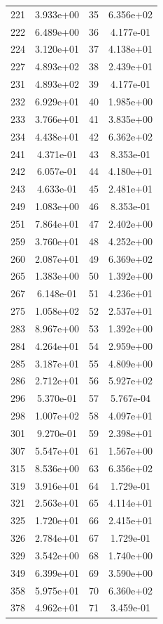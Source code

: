 \documentclass[12pt]{article}
\begin{document}
\begin{longtable}{@{}cccc@{}}
221 & 3.933e+00 & 35 & 6.356e+02 \\
222 & 6.489e+00 & 36 & 4.177e-01 \\
224 & 3.120e+01 & 37 & 4.138e+01 \\
227 & 4.893e+02 & 38 & 2.439e+01 \\
231 & 4.893e+02 & 39 & 4.177e-01 \\
232 & 6.929e+01 & 40 & 1.985e+00 \\
233 & 3.766e+01 & 41 & 3.835e+00 \\
234 & 4.438e+01 & 42 & 6.362e+02 \\
241 & 4.371e-01 & 43 & 8.353e-01 \\
242 & 6.057e-01 & 44 & 4.180e+01 \\
243 & 4.633e-01 & 45 & 2.481e+01 \\
249 & 1.083e+00 & 46 & 8.353e-01 \\
251 & 7.864e+01 & 47 & 2.402e+00 \\
259 & 3.760e+01 & 48 & 4.252e+00 \\
260 & 2.087e+01 & 49 & 6.369e+02 \\
265 & 1.383e+00 & 50 & 1.392e+00 \\
267 & 6.148e-01 & 51 & 4.236e+01 \\
275 & 1.058e+02 & 52 & 2.537e+01 \\
283 & 8.967e+00 & 53 & 1.392e+00 \\
284 & 4.264e+01 & 54 & 2.959e+00 \\
285 & 3.187e+01 & 55 & 4.809e+00 \\
286 & 2.712e+01 & 56 & 5.927e+02 \\
296 & 5.370e-01 & 57 & 5.767e-04 \\
298 & 1.007e+02 & 58 & 4.097e+01 \\
301 & 9.270e-01 & 59 & 2.398e+01 \\
307 & 5.547e+01 & 61 & 1.567e+00 \\
315 & 8.536e+00 & 63 & 6.356e+02 \\
319 & 3.916e+01 & 64 & 1.729e-01 \\
321 & 2.563e+01 & 65 & 4.114e+01 \\
325 & 1.720e+01 & 66 & 2.415e+01 \\
326 & 2.784e+01 & 67 & 1.729e-01 \\
329 & 3.542e+00 & 68 & 1.740e+00 \\
349 & 6.399e+01 & 69 & 3.590e+00 \\
358 & 5.975e+01 & 70 & 6.360e+02 \\
378 & 4.962e+01 & 71 & 3.459e-01 \\

\end{longtable}
\end{document}

